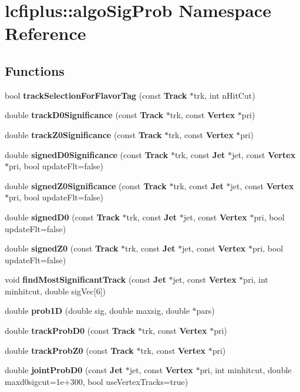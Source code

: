 \section{lcfiplus\+:\+:algo\+Sig\+Prob Namespace Reference}
\label{namespacelcfiplus_1_1algoSigProb}
\subsection*{Functions}
\begin{DoxyCompactItemize}
\item 
bool \textbf{ track\+Selection\+For\+Flavor\+Tag} (const \textbf{ Track} $\ast$trk, int n\+Hit\+Cut)
\item 
double \textbf{ track\+D0\+Significance} (const \textbf{ Track} $\ast$trk, const \textbf{ Vertex} $\ast$pri)
\item 
double \textbf{ track\+Z0\+Significance} (const \textbf{ Track} $\ast$trk, const \textbf{ Vertex} $\ast$pri)
\item 
double \textbf{ signed\+D0\+Significance} (const \textbf{ Track} $\ast$trk, const \textbf{ Jet} $\ast$jet, const \textbf{ Vertex} $\ast$pri, bool update\+Flt=false)
\item 
double \textbf{ signed\+Z0\+Significance} (const \textbf{ Track} $\ast$trk, const \textbf{ Jet} $\ast$jet, const \textbf{ Vertex} $\ast$pri, bool update\+Flt=false)
\item 
double \textbf{ signed\+D0} (const \textbf{ Track} $\ast$trk, const \textbf{ Jet} $\ast$jet, const \textbf{ Vertex} $\ast$pri, bool update\+Flt=false)
\item 
double \textbf{ signed\+Z0} (const \textbf{ Track} $\ast$trk, const \textbf{ Jet} $\ast$jet, const \textbf{ Vertex} $\ast$pri, bool update\+Flt=false)
\item 
void \textbf{ find\+Most\+Significant\+Track} (const \textbf{ Jet} $\ast$jet, const \textbf{ Vertex} $\ast$pri, int minhitcut, double sig\+Vec[6])
\item 
double \textbf{ prob1D} (double sig, double maxsig, double $\ast$pars)
\item 
double \textbf{ track\+Prob\+D0} (const \textbf{ Track} $\ast$trk, const \textbf{ Vertex} $\ast$pri)
\item 
double \textbf{ track\+Prob\+Z0} (const \textbf{ Track} $\ast$trk, const \textbf{ Vertex} $\ast$pri)
\item 
double \textbf{ joint\+Prob\+D0} (const \textbf{ Jet} $\ast$jet, const \textbf{ Vertex} $\ast$pri, int minhitcut, double maxd0sigcut=1e+300, bool use\+Vertex\+Tracks=true)

\end{DoxyCompactItemize}

